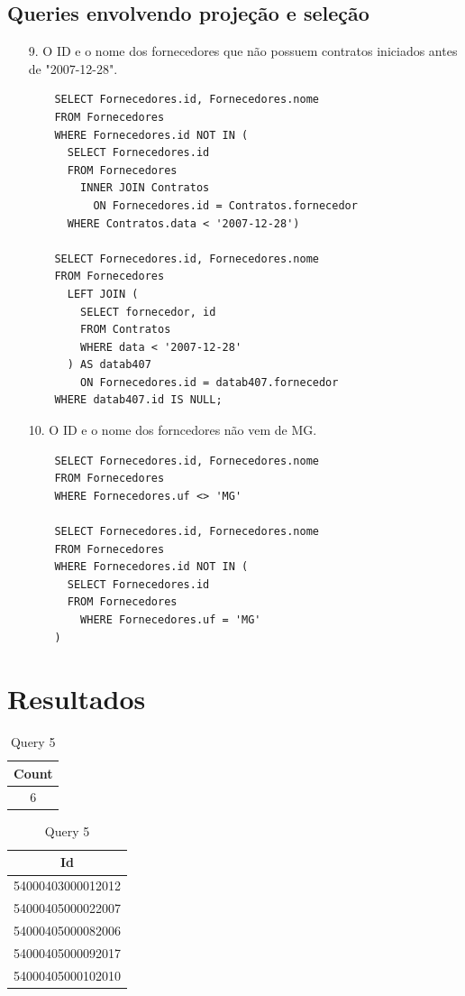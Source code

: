 \documentclass{article}
\begin{document}
\subsection{Queries envolvendo projeção e seleção}
\begin{itemize}
\item[9.] O ID e o nome dos fornecedores que não possuem contratos iniciados antes de "2007-12-28".
  \begin{verbatim}
    SELECT Fornecedores.id, Fornecedores.nome
    FROM Fornecedores
    WHERE Fornecedores.id NOT IN (
      SELECT Fornecedores.id
      FROM Fornecedores
        INNER JOIN Contratos
          ON Fornecedores.id = Contratos.fornecedor
      WHERE Contratos.data < '2007-12-28')
      
    SELECT Fornecedores.id, Fornecedores.nome
    FROM Fornecedores
      LEFT JOIN (
        SELECT fornecedor, id
        FROM Contratos
        WHERE data < '2007-12-28'
      ) AS datab407
        ON Fornecedores.id = datab407.fornecedor 
    WHERE datab407.id IS NULL;
    \end{verbatim}
\item[10.] O ID e o nome dos forncedores não vem de MG.
  \begin{verbatim}
    SELECT Fornecedores.id, Fornecedores.nome
    FROM Fornecedores
    WHERE Fornecedores.uf <> 'MG'

    SELECT Fornecedores.id, Fornecedores.nome
    FROM Fornecedores
    WHERE Fornecedores.id NOT IN (
      SELECT Fornecedores.id
      FROM Fornecedores
	    WHERE Fornecedores.uf = 'MG'
    )

    \end{verbatim}
\end{itemize}
\pagebreak
\section{Resultados}
\begin{table}[H]
  \begin{minipage}{.5\linewidth}
    \centering
    \begin{tabular}{c}
      {Count} \\
      \midrule
      6 \\
      \bottomrule
    \end{tabular}
    \caption*{Query 1}
  \end{minipage}
  \begin{minipage}{.5\linewidth}
    \centering
    \begin{tabular}{c}
      Id \\
      \midrule
      54000403000012012 \\
      54000405000022007 \\
      54000405000082006 \\
      54000405000092017 \\
      54000405000102010 \\
      \bottomrule
    \end{tabular}
    \caption*{Query 5}
  \end{minipage}
\end{table}
\end{document}

